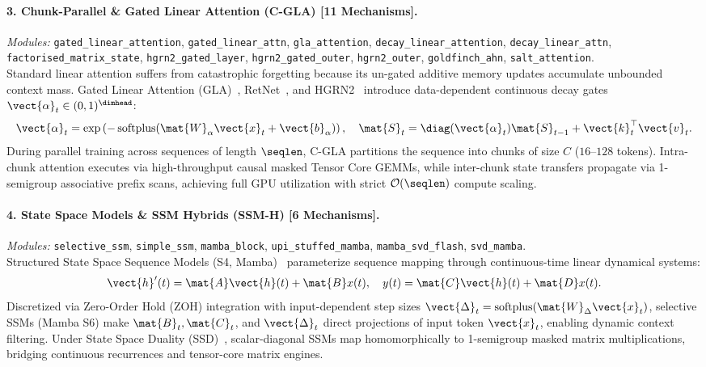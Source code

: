 \paragraph{3. Chunk-Parallel \& Gated Linear Attention (C-GLA) [11 Mechanisms].}
\textit{Modules:} \texttt{gated\_linear\_attention}, \texttt{gated\_linear\_attn}, \texttt{gla\_attention}, \texttt{decay\_linear\_attention}, \texttt{decay\_linear\_attn}, \texttt{factorised\_matrix\_state}, \texttt{hgrn2\_gated\_layer}, \texttt{hgrn2\_gated\_outer}, \texttt{hgrn2\_outer}, \texttt{goldfinch\_ahn}, \texttt{salt\_attention}. \\
Standard linear attention suffers from catastrophic forgetting because its un-gated additive memory updates accumulate unbounded context mass. Gated Linear Attention (GLA)~\cite{yang2023gated}, RetNet~\cite{sun2023retentive}, and HGRN2~\cite{dong2024hgrn2} introduce data-dependent continuous decay gates $\vect{\alpha}_t \in (0, 1)^{\dimhead}$:
\begin{equation}
\vect{\alpha}_t = \exp\left(-\operatorname{softplus}(\mat{W}_\alpha \vect{x}_t + \vect{b}_\alpha)\right), \quad \mat{S}_t = \diag(\vect{\alpha}_t) \mat{S}_{t-1} + \vect{k}_t^\top \vect{v}_t.
\end{equation}
During parallel training across sequences of length $\seqlen$, C-GLA partitions the sequence into chunks of size $C$ ($16\text{--}128$ tokens). Intra-chunk attention executes via high-throughput causal masked Tensor Core GEMMs, while inter-chunk state transfers propagate via 1-semigroup associative prefix scans, achieving full GPU utilization with strict $\mathcal{O}(\seqlen)$ compute scaling.

\paragraph{4. State Space Models \& SSM Hybrids (SSM-H) [6 Mechanisms].}
\textit{Modules:} \texttt{selective\_ssm}, \texttt{simple\_ssm}, \texttt{mamba\_block}, \texttt{upi\_stuffed\_mamba}, \texttt{mamba\_svd\_flash}, \texttt{svd\_mamba}. \\
Structured State Space Sequence Models (S4, Mamba)~\cite{gu2021efficiently,gu2022mamba} parameterize sequence mapping through continuous-time linear dynamical systems:
\begin{equation}
\vect{h}'(t) = \mat{A} \vect{h}(t) + \mat{B} x(t), \quad y(t) = \mat{C} \vect{h}(t) + \mat{D} x(t).
\end{equation}
Discretized via Zero-Order Hold (ZOH) integration with input-dependent step sizes $\vect{\Delta}_t = \operatorname{softplus}(\mat{W}_\Delta \vect{x}_t)$, selective SSMs (Mamba S6) make $\mat{B}_t, \mat{C}_t$, and $\vect{\Delta}_t$ direct projections of input token $\vect{x}_t$, enabling dynamic context filtering. Under State Space Duality (SSD)~\cite{dao2024mamba2}, scalar-diagonal SSMs map homomorphically to 1-semigroup masked matrix multiplications, bridging continuous recurrences and tensor-core matrix engines.


